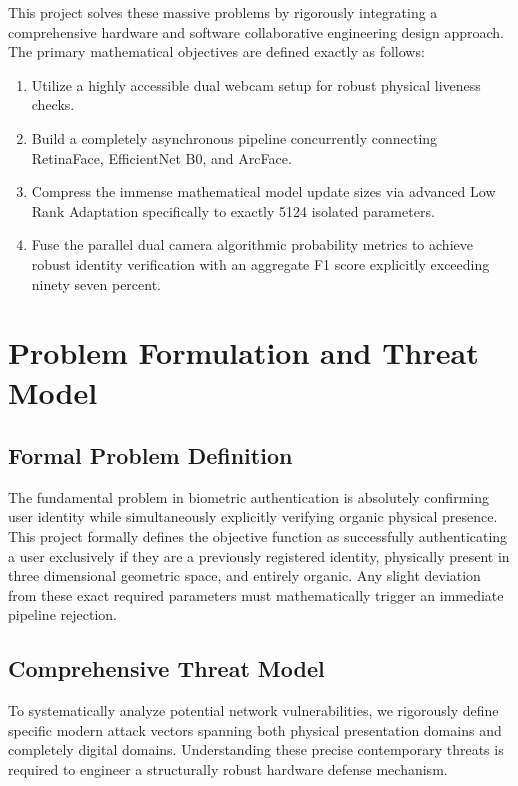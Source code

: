 \documentclass[12pt,a4paper]{report}
\begin{document}
This project solves these massive problems by rigorously integrating a comprehensive hardware and software collaborative engineering design approach. The primary mathematical objectives are defined exactly as follows:
\begin{enumerate}
    \item Utilize a highly accessible dual webcam setup for robust physical liveness checks.
    \item Build a completely asynchronous pipeline concurrently connecting RetinaFace, EfficientNet B0, and ArcFace.
    \item Compress the immense mathematical model update sizes via advanced Low Rank Adaptation specifically to exactly 5124 isolated parameters.
    \item Fuse the parallel dual camera algorithmic probability metrics to achieve robust identity verification with an aggregate F1 score explicitly exceeding ninety seven percent.
\end{enumerate}

\chapter{Problem Formulation and Threat Model}
\section{Formal Problem Definition}
The fundamental problem in biometric authentication is absolutely confirming user identity while simultaneously explicitly verifying organic physical presence. This project formally defines the objective function as successfully authenticating a user exclusively if they are a previously registered identity, physically present in three dimensional geometric space, and entirely organic. Any slight deviation from these exact required parameters must mathematically trigger an immediate pipeline rejection.

\section{Comprehensive Threat Model}
To systematically analyze potential network vulnerabilities, we rigorously define specific modern attack vectors spanning both physical presentation domains and completely digital domains. Understanding these precise contemporary threats is required to engineer a structurally robust hardware defense mechanism.
\end{document}
